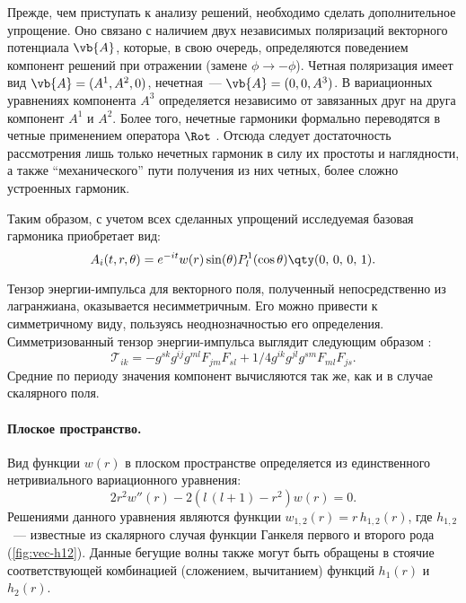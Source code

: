 \documentclass[\docroot/reports/draft/report.tex]{subfiles}
\begin{document}
    Прежде, чем приступать к анализу решений, необходимо сделать дополнительное упрощение. Оно связано с наличием двух независимых поляризаций векторного потенциала $\vb{A}$, которые, в свою очередь, определяются поведением компонент решений при отражении (замене $\phi \to -\phi$). Четная поляризация имеет вид $\vb{A} = (A^1, A^2, 0)$, нечетная~--- $\vb{A} = (0, 0, A^3)$. В вариационных уравнениях компонента $A^3$ определяется независимо от завязанных друг на друга компонент $A^1$ и $A^2$. Более того, нечетные гармоники формально переводятся в четные применением оператора $\Rot$ \cite{Vas2018a,BurVas2019}. Отсюда следует достаточность рассмотрения лишь только нечетных гармоник в силу их простоты и наглядности, а также \enquote{механического} пути получения из них четных, более сложно устроенных гармоник.

    Таким образом, с учетом всех сделанных упрощений исследуемая базовая гармоника приобретает вид:
    \begin{equation}
        A_i(t,r,\theta) = e^{-i t} w(r) \sin(\theta) P_l^1(\cos\theta) \qty(0,\,0,\,0,\,1).
    \end{equation}

    Тензор энергии-импульса для векторного поля, полученный непосредственно из лагранжиана, оказывается несимметричным. Его можно привести к симметричному виду, пользуясь неоднозначностью его определения. Симметризованный тензор энергии-импульса выглядит следующим образом \cite{landau_v2}:
    \begin{equation}
        \mathcal{T}_{ik} = -g^{sk} g^{ij} g^{ml} F_{jm} F_{sl} + 1/4 g^{ik} g^{jl} g^{sm} F_{ml} F_{js} .
    \end{equation}
    Средние по периоду значения компонент вычисляются так же, как и в случае скалярного поля.

    \paragraph{Плоское пространство.}

        Вид функции $w(r)$ в плоском пространстве определяется из единственного нетривиального вариационного уравнения:
        \begin{equation}\label{eq:vec-m-eq}
            2 r^2 w''(r) - 2 (l\,(l + 1) - r^2) w(r) = 0.
        \end{equation}
        Решениями данного уравнения являются функции $w_{1,2}(r) = r\,h_{1,2}(r)$, где $h_{1,2}$~--- известные из скалярного случая функции Ганкеля первого и второго рода (\autoref{fig:vec-h12}). Данные бегущие волны также могут быть обращены в стоячие соответствующей комбинацией (сложением, вычитанием) функций $h_1(r)$ и $h_2(r)$.
\end{document}
